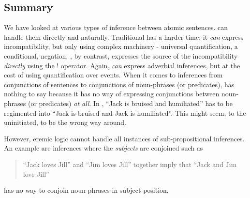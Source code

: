 \subsection{Summary}
We have looked at various types of inference between atomic
sentences. \ELFULL{} can handle them directly and naturally.  Traditional
\fol has a harder time: it
\emph{can} express incompatibility, but only using complex machinery -
universal quantification, a conditional, negation. \ELFULL{}, by
contrast, expresses the source of the incompatibility \emph{directly}
using the $!$ operator.  Again, \fol \emph{can} express
adverbial inferences, but at the cost of using quantification over
events.  When it comes to inferences from conjunctions of sentences to
conjunctions of noun-phrases (or predicates), \fol has
nothing to say because it has no way of expressing conjunctions
between noun-phrases (or predicates) \emph{at all}. In \fol, ``Jack is bruised and humiliated'' has to be regimented into
``Jack is bruised and Jack is humiliated''.  This might seem, to the uninitiated, to be the
wrong way around.  

However, eremic logic cannot handle all instances
of sub-propositional inferences.  An example are inferences where the
\emph{subjects} are conjoined such as
\begin{quote}
``Jack loves Jill'' and ``Jim loves Jill'' together imply that ``Jack and Jim love Jill''
\end{quote}

\NI \ELFULL{} has no way to conjoin noun-phrases in subject-position.
